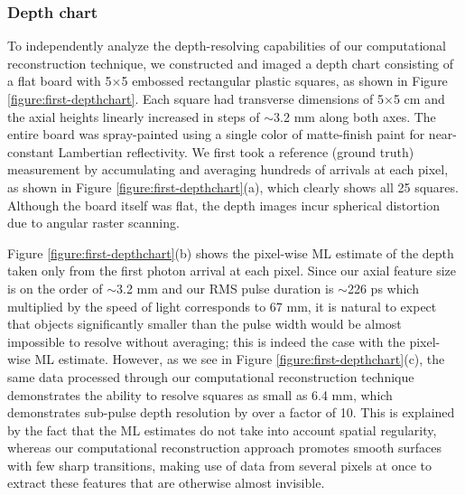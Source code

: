 \subsubsection{Depth chart}

To independently analyze the depth-resolving capabilities of our computational reconstruction technique, we constructed and imaged a depth chart consisting of a flat board with 5$\times$5 embossed rectangular plastic squares, as shown in Figure \ref{figure:first-depthchart}. Each square had transverse dimensions of 5$\times$5 cm and the axial heights linearly increased in steps of $\sim$3.2 mm along both axes. The entire board was spray-painted using a single color of matte-finish paint for near-constant Lambertian reflectivity. We first took a reference (ground truth) measurement by accumulating and averaging hundreds of arrivals at each pixel, as shown in Figure \ref{figure:first-depthchart}(a), which clearly shows all 25 squares. Although the board itself was flat, the depth images incur spherical distortion due to angular raster scanning.

Figure \ref{figure:first-depthchart}(b) shows the pixel-wise ML estimate of the depth taken only from the first photon arrival at each pixel. Since our axial feature size is on the order of $\sim$3.2 mm and our RMS pulse duration is $\sim$226 ps which multiplied by the speed of light corresponds to 67 mm, it is natural to expect that objects significantly smaller than the pulse width would be almost impossible to resolve without averaging; this is indeed the case with the pixel-wise ML estimate. However, as we see in Figure \ref{figure:first-depthchart}(c), the same data processed through our computational reconstruction technique demonstrates the ability to resolve squares as small as 6.4 mm, which demonstrates sub-pulse depth resolution by over a factor of 10. This is explained by the fact that the ML estimates do not take into account spatial regularity, whereas our computational reconstruction approach promotes smooth surfaces with few sharp transitions, making use of data from several pixels at once to extract these features that are otherwise almost invisible.

